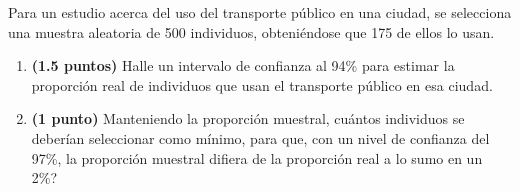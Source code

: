 
Para un estudio acerca del uso del transporte público en una ciudad,
se selecciona una muestra aleatoria de 500 individuos, obteniéndose que
175 de ellos lo usan.
\begin{enumerate}[label=\alph*)]
  \item \textbf{(1.5 puntos)} Halle un intervalo de confianza al 94\% para
  estimar la proporción real de individuos que usan el transporte público
  en esa ciudad.
  \item \textbf{(1 punto)} Manteniendo la proporción muestral,
  \textquestiondown{}cuántos individuos se deberían seleccionar como mínimo,
  para que, con un nivel de confianza del 97\%, la proporción muestral
  difiera de la proporción real a lo sumo en un 2\%?
\end{enumerate}
